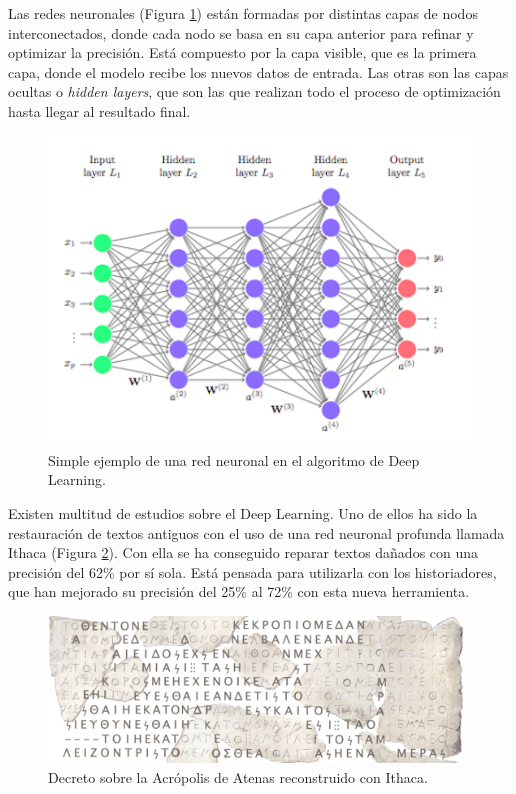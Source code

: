 Las redes neuronales (Figura \ref{fig:red}) están formadas por distintas capas de nodos interconectados, donde cada nodo se basa en su capa anterior para refinar y optimizar la precisión. Está compuesto por la capa visible, que es la primera capa, donde el modelo recibe los nuevos datos de entrada. Las otras son las capas ocultas o \textit{hidden layers}, que son las que realizan todo el proceso de optimización hasta llegar al resultado final.\\
\begin{figure} [h!]
  \begin{center}
    \includegraphics[width=12cm]{figs/deep_learning}
  \end{center}
  \caption{Simple ejemplo de una red neuronal en el algoritmo de Deep Learning.}
  \label{fig:red}
\end{figure}

Existen multitud de estudios sobre el Deep Learning. Uno de ellos ha sido la restauración de textos antiguos con el uso de una red neuronal profunda llamada Ithaca \cite{assael22} (Figura \ref{fig:textos}). Con ella se ha conseguido reparar textos dañados con una precisión del 62\% por sí sola. Está pensada para utilizarla con los historiadores, que han mejorado su precisión del 25\% al 72\% con esta nueva herramienta.\\
\begin{figure} [h!]
  \begin{center}
    \includegraphics[width=11cm]{figs/textos}
  \end{center}
  \caption{Decreto sobre la Acrópolis de Atenas reconstruido con Ithaca.}
  \label{fig:textos}
\end{figure}

